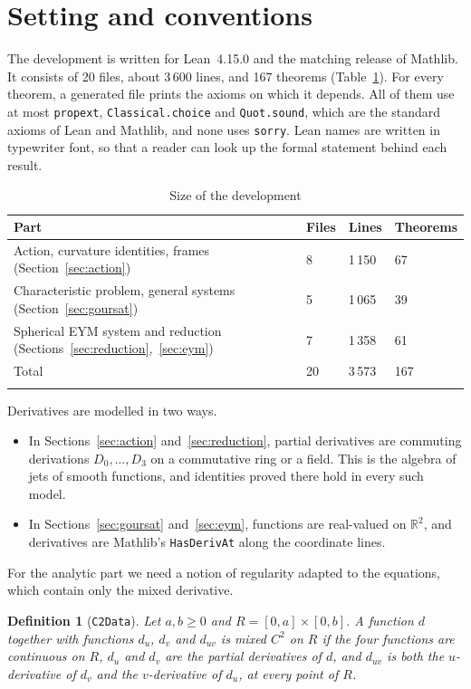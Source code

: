 \documentclass[pdflatex,sn-mathphys-num]{sn-jnl}%
\theoremstyle{thmstyleone}%
\theoremstyle{thmstyletwo}%
\theoremstyle{thmstylethree}%
\newtheorem{definition}{Definition}%
\newcommand{\lean}[1]{\texttt{#1}}
\newcommand{\R}{\mathbb{R}}
\begin{document}
\section{Setting and conventions}\label{sec:setting}

The development is written for Lean~4.15.0 and the matching release of Mathlib. It consists of 20 files, about 3\,600 lines, and 167 theorems (Table~\ref{tab:size}). For every theorem, a generated file prints the axioms on which it depends. All of them use at most \lean{propext}, \lean{Classical.choice} and \lean{Quot.sound}, which are the standard axioms of Lean and Mathlib, and none uses \lean{sorry}. Lean names are written in typewriter font, so that a reader can look up the formal statement behind each result.

\begin{table}[h]
\caption{Size of the development}\label{tab:size}%
\begin{tabular}{@{}llll@{}}
\toprule
Part & Files & Lines & Theorems\\
\midrule
Action, curvature identities, frames (Section~\ref{sec:action}) & 8 & 1\,150 & 67\\
Characteristic problem, general systems (Section~\ref{sec:goursat}) & 5 & 1\,065 & 39\\
Spherical EYM system and reduction (Sections~\ref{sec:reduction},~\ref{sec:eym}) & 7 & 1\,358 & 61\\
\midrule
Total & 20 & 3\,573 & 167\\
\botrule
\end{tabular}
\end{table}

Derivatives are modelled in two ways.
\begin{itemize}
\item In Sections~\ref{sec:action} and~\ref{sec:reduction}, partial derivatives are commuting derivations $D_0,\dots,D_3$ on a commutative ring or a field. This is the algebra of jets of smooth functions, and identities proved there hold in every such model.
\item In Sections~\ref{sec:goursat} and~\ref{sec:eym}, functions are real-valued on $\R^2$, and derivatives are Mathlib's \lean{HasDerivAt} along the coordinate lines.
\end{itemize}

For the analytic part we need a notion of regularity adapted to the equations, which contain only the mixed derivative.

\begin{definition}[\lean{C2Data}]\label{def:c2}
Let $a,b\ge0$ and $R=[0,a]\times[0,b]$. A function $d$ together with functions $d_u$, $d_v$ and $d_{uv}$ is \emph{mixed $C^2$ on $R$} if the four functions are continuous on $R$, $d_u$ and $d_v$ are the partial derivatives of $d$, and $d_{uv}$ is both the $u$-derivative of $d_v$ and the $v$-derivative of $d_u$, at every point of $R$.
\end{definition}
\end{document}
